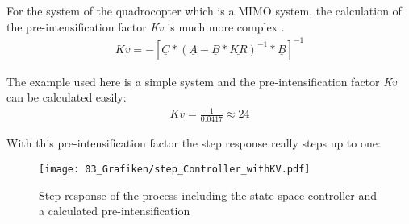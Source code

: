 For the system of the quadrocopter which is a MIMO system, the calculation of the pre-intensification factor \textit{Kv} is much more complex .
\begin{align}\label{Kvcomplex}
	Kv = -\left[\underline{C} * (\underline{A} - \underline{B} * \underline{KR})^{-1} * \underline{B} \right]^{-1}
\end{align}

The example used here is a simple system and the pre-intensification factor \textit{Kv} can be calculated easily:
\begin{align}
	Kv = \frac{1}{0.0417} \approx 24
\end{align}

With this pre-intensification factor the step response really steps up to one:

\begin{figure}
	\centering
		\texttt{[image: 03\_Grafiken/step\_Controller\_withKV.pdf]}
	\caption{Step response of the process including the state space controller and a calculated pre-intensification}
	\label{fig:stepControlKV24}
\end{figure}
